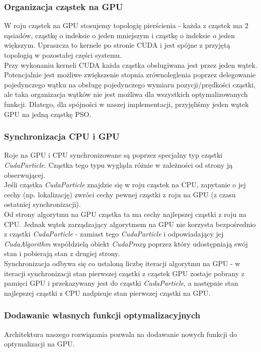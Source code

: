\documentclass[12pt, twoside, openany, abstract=on]{report}
\theoremstyle{definition}
\begin{document}
\subsubsection{Organizacja cząstek na GPU}
W roju cząstek na GPU stosujemy topologię pierścienia - każda z cząstek ma 2 sąsiadów, cząstkę o indeksie o jeden mniejszym i cząstkę o indeksie o jeden większym. Upraszcza to kernele po stronie CUDA i jest spójne z przyjętą topologią w pozostałej części systemu. \\
Przy wykonaniu kerneli CUDA każda cząstka obsługiwana jest przez jeden wątek. Potencjalnie jest możliwe zwiększenie stopnia zrównoleglenia poprzez delegowanie pojedynczego wątku na obsługę pojedynczego wymiaru pozycji/prędkości cząstki, ale taka organizacja wątków nie jest możliwa dla wszystkich optymalizowanych funkcji. Dlatego, dla spójności w naszej implementacji, przyjęliśmy jeden wątek GPU na jedną cząstkę PSO.

\subsubsection{Synchronizacja CPU i GPU}
Roje na GPU i CPU synchronizowane są poprzez specjalny typ cząstki \textit{CudaParticle}. Cząstka tego typu wygląda różnie w zależności od strony ją obserwującej. \\
Jeśli cząstka \textit{CudaParticle} znajdzie się w roju cząstek na CPU, zapytanie o jej cechy (np. lokalizację) zwróci cechy pewnej cząstki z roju na GPU (z czasu ostatniej synchronizacji).  \\
Od strony algorytmu na GPU cząstka ta ma cechy najlepszej cząstki z roju na CPU. Jednak wątek zarządzający algorytmem na GPU nie korzysta bezpośrednio z cząstki \textit{CudaParticle} - zamiast tego \textit{CudaParticle} i odpowiadający jej \textit{CudaAlgorithm} współdzielą obiekt \textit{CudaProxy} poprzez który udostępniają swój stan i pobierają stan z drugiej strony. \\
Synchronizacja odbywa się co ustaloną liczbę iteracji algorytmu na GPU - w iteracji synchronizacji stan pierwszej cząstki z cząstek GPU zostaje pobrany z pamięci GPU i przekazywany jest do cząstki \textit{CudaParticle}, a następnie stan najlepszej cząstki z CPU nadpisuje stan pierwszej cząstki na GPU. 
  
\subsubsection{Dodawanie własnych funkcji optymalizacyjnych}
Architektura naszego rozwiązania pozwala na dodawanie nowych funkcji do optymalizacji na GPU. \\
\end{document}
